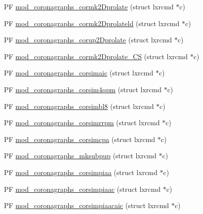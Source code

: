 \begin{DoxyCompactItemize}
\item 
P\+F \hyperlink{src_2coronagraphs_2coronagraphs-util_8c_a4a8c6bc3b436950d57c8edff7d08c8b1}{mod\+\_\+coronagraphs\+\_\+cormk2\+Dprolate} (struct lxrcmd $\ast$c)
\item 
P\+F \hyperlink{src_2coronagraphs_2coronagraphs-util_8c_a0e2a39ce8179e984872fc28ed424a83e}{mod\+\_\+coronagraphs\+\_\+cormk2\+Dprolateld} (struct lxrcmd $\ast$c)
\item 
P\+F \hyperlink{src_2coronagraphs_2coronagraphs-util_8c_a949c485b2474e41f248a17478008a164}{mod\+\_\+coronagraphs\+\_\+corup2\+Dprolate} (struct lxrcmd $\ast$c)
\item 
P\+F \hyperlink{src_2coronagraphs_2coronagraphs-util_8c_aa5a2f9ae091e94fad26d42f8d55467d3}{mod\+\_\+coronagraphs\+\_\+cormk2\+Dprolate\+\_\+\+C\+S} (struct lxrcmd $\ast$c)
\item 
P\+F \hyperlink{src_2coronagraphs_2coronagraphs-util_8c_a9fa4dfe8c15d371ec5f9ab96589e350b}{mod\+\_\+coronagraphs\+\_\+corsimaic} (struct lxrcmd $\ast$c)
\item 
P\+F \hyperlink{src_2coronagraphs_2coronagraphs-util_8c_aa1e124dd3e89153a39139d1bc5f48a6c}{mod\+\_\+coronagraphs\+\_\+corsim4qpm} (struct lxrcmd $\ast$c)
\item 
P\+F \hyperlink{src_2coronagraphs_2coronagraphs-util_8c_a3ea43d8fb405d63839784ce312d88f53}{mod\+\_\+coronagraphs\+\_\+corsimbl8} (struct lxrcmd $\ast$c)
\item 
P\+F \hyperlink{src_2coronagraphs_2coronagraphs-util_8c_a02e9ac984e27521eaf1054d546ca9d8e}{mod\+\_\+coronagraphs\+\_\+corsimrrpm} (struct lxrcmd $\ast$c)
\item 
P\+F \hyperlink{src_2coronagraphs_2coronagraphs-util_8c_af6fc8c21c4930344b7d4fd71b5ab062b}{mod\+\_\+coronagraphs\+\_\+corsimcpa} (struct lxrcmd $\ast$c)
\item 
P\+F \hyperlink{src_2coronagraphs_2coronagraphs-util_8c_afdac82ed1f2f851d2601fc33afe9bbad}{mod\+\_\+coronagraphs\+\_\+mksubpup} (struct lxrcmd $\ast$c)
\item 
P\+F \hyperlink{src_2coronagraphs_2coronagraphs-util_8c_ac5101e2ead368ac863546684da4310fe}{mod\+\_\+coronagraphs\+\_\+corsimpiaa} (struct lxrcmd $\ast$c)
\item 
P\+F \hyperlink{src_2coronagraphs_2coronagraphs-util_8c_a103ebd989fc710ee5078cbad55f80122}{mod\+\_\+coronagraphs\+\_\+corsimpiaac} (struct lxrcmd $\ast$c)
\item 
P\+F \hyperlink{src_2coronagraphs_2coronagraphs-util_8c_ae1bae2c1d62a3c1db1536f8d34cfc35f}{mod\+\_\+coronagraphs\+\_\+corsimpiaacaic} (struct lxrcmd $\ast$c)

\end{DoxyCompactItemize}
